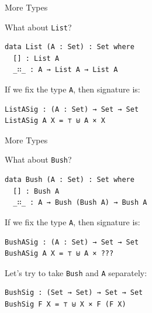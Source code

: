 \documentclass{beamer}
\begin{document}
\begin{frame}[fragile]{More Types}

What about \texttt{List}?

\begin{exampleblock}{}
\begin{verbatim}
data List (A : Set) : Set where
  [] : List A
  _∷_ : A → List A → List A
\end{verbatim}
\end{exampleblock}

If we fix the type \texttt{A}, then signature is:

\begin{exampleblock}{}
\begin{verbatim}
ListASig : (A : Set) → Set → Set
ListASig A X = ⊤ ⊎ A × X
\end{verbatim}
\end{exampleblock}
\end{frame}

\begin{frame}[fragile]{More Types}

What about \texttt{Bush}?

\begin{exampleblock}{}
\begin{verbatim}
data Bush (A : Set) : Set where
  [] : Bush A
  _∷_ : A → Bush (Bush A) → Bush A
\end{verbatim}
\end{exampleblock}

If we fix the type \texttt{A}, then signature is:

\begin{exampleblock}{}
\begin{verbatim}
BushASig : (A : Set) → Set → Set
BushASig A X = ⊤ ⊎ A × ???
\end{verbatim}
\end{exampleblock}

\pause
Let's try to take \texttt{Bush} and \texttt{A} separately:

\begin{exampleblock}{}
\begin{verbatim}
BushSig : (Set → Set) → Set → Set
BushSig F X = ⊤ ⊎ X × F (F X)
\end{verbatim}
\end{exampleblock}
\end{frame}
\end{document}
